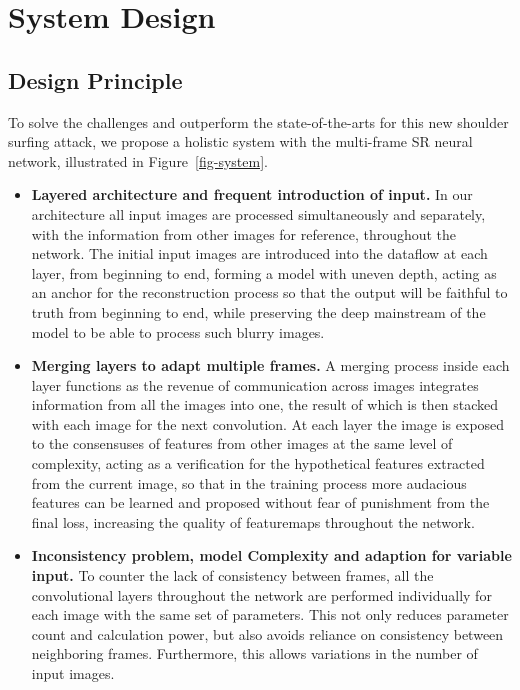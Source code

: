 \section{System Design}
\label{sec-design}

\subsection{Design Principle}
To solve the challenges and outperform the state-of-the-arts for this new shoulder surfing attack, we propose a holistic system with the multi-frame SR neural network, illustrated in Figure~\ref{fig-system}.

\begin{itemize}[leftmargin=*]
    \item \textbf{Layered architecture and frequent introduction of input.} In our architecture all input images are processed simultaneously and separately, with the information from other images for reference, throughout the network. The initial input images are introduced into the dataflow at each layer, from beginning to end, forming a model with uneven depth, acting as an anchor for the reconstruction process so that the output will be faithful to truth from beginning to end, while preserving the deep mainstream of the model to be able to process such blurry images.
    \item \textbf{Merging layers to adapt multiple frames.} A merging process inside each layer functions as the revenue of communication across images integrates information from all the images into one, the result of which is then stacked with each image for the next convolution. At each layer the image is exposed to the consensuses of features from other images at the same level of complexity, acting as a verification for the hypothetical features extracted from the current image, so that in the training process more audacious features can be learned and proposed without fear of punishment from the final loss, increasing the quality of featuremaps throughout the network.
    \item \textbf{Inconsistency problem, model Complexity and adaption for variable input.} To counter the lack of consistency between frames, all the convolutional layers throughout the network are performed individually for each image with the same set of parameters. This not only reduces parameter count and calculation power, but also avoids reliance on consistency between neighboring frames. Furthermore, this allows variations in the number of input images.

\end{itemize}
